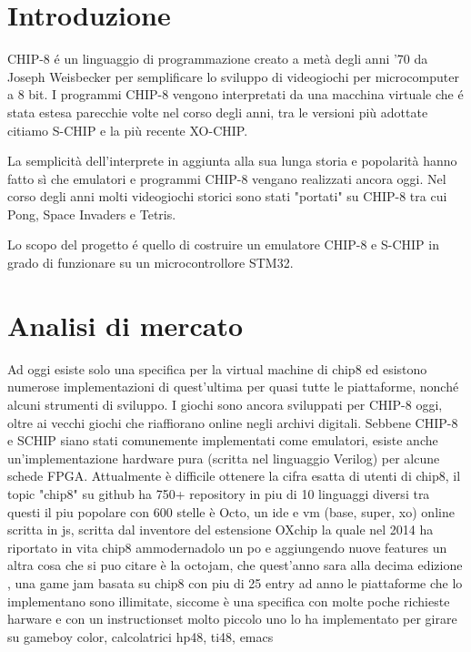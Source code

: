 \documentclass[a4paper]{article}
\begin{document}
\setlength{\parindent}{0pt}
\setlength{\parskip}{0.8em}
\linespread{1.5}

\section{Introduzione}

CHIP-8 é un linguaggio di programmazione creato a metà degli anni '70 da Joseph Weisbecker per semplificare lo sviluppo di videogiochi per microcomputer a 8 bit. I programmi CHIP-8 vengono interpretati da una macchina virtuale che é stata estesa parecchie volte nel corso degli anni, tra le versioni più adottate citiamo S-CHIP e la più recente XO-CHIP.

La semplicità dell'interprete in aggiunta alla sua lunga storia e popolarità hanno fatto sì che emulatori e programmi CHIP-8 vengano realizzati ancora oggi. Nel corso degli anni molti videogiochi storici sono stati "portati" su CHIP-8 tra cui Pong, Space Invaders e Tetris.

Lo scopo del progetto é quello di costruire un emulatore CHIP-8 e S-CHIP in grado di funzionare su un microcontrollore STM32.

\section{Analisi di mercato}

Ad oggi esiste solo una specifica per la virtual machine di chip8 ed esistono numerose implementazioni di quest'ultima per quasi tutte le piattaforme, nonché alcuni strumenti di sviluppo.
I giochi sono ancora sviluppati per CHIP-8 oggi, oltre ai vecchi giochi che riaffiorano online negli archivi digitali.
Sebbene CHIP-8 e SCHIP siano stati comunemente implementati come emulatori, esiste anche un'implementazione hardware pura (scritta nel linguaggio Verilog) per alcune schede FPGA.
Attualmente è difficile ottenere la cifra esatta di utenti di chip8,
il topic "chip8" su github ha 750+ repository in piu di 10 linguaggi diversi
tra questi il piu popolare con 600 stelle è Octo, un ide e vm (base, super, xo) online scritta in js, scritta dal inventore del estensione OXchip la quale nel 2014 ha riportato in vita chip8 ammodernadolo un po e aggiungendo nuove features 
un altra cosa che si puo citare è la octojam, che quest'anno sara alla decima edizione , una game jam basata su chip8 con piu di 25 entry ad anno
le piattaforme che lo implementano sono illimitate, siccome è una specifica con molte poche richieste harware e con un instructionset molto piccolo
uno lo ha implementato per girare su gameboy color, calcolatrici hp48, ti48, emacs
\end{document}
